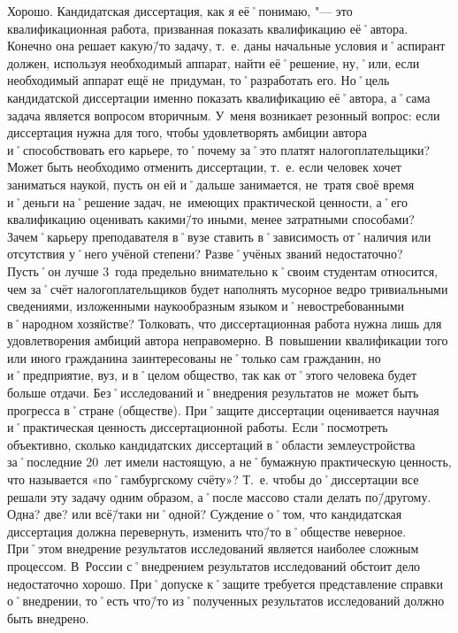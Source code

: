\begin{drama}
	\maxspeaks Хорошо. Кандидатская диссертация, как я её˚понимаю, "--- это квалификационная работа, призванная показать квалификацию её˚автора. Конечно она решает какую\=/то задачу, т.~е. даны начальные условия и˚аспирант должен, используя необходимый аппарат, найти её˚решение, ну,˚или, если необходимый аппарат ещё не~придуман, то˚разработать его. Но˚цель кандидатской диссертации именно показать квалификацию её˚автора, а˚сама задача является вопросом вторичным. У~меня возникает резонный вопрос: если диссертация нужна для того, чтобы удовлетворять амбиции автора и˚способствовать его карьере, то˚почему за˚это платят налогоплательщики? Может быть необходимо отменить диссертации, т.~е. если человек хочет заниматься наукой, пусть он ей и˚дальше занимается, не~тратя своё время и˚деньги на˚решение задач, не~имеющих практической ценности, а˚его квалификацию оценивать какими\=/то иными, менее затратными способами? Зачем˚карьеру преподавателя в˚вузе ставить в˚зависимость от˚наличия или отсутствия у˚него учёной степени? Разве˚учёных званий недостаточно? Пусть˚он лучше 3~года предельно внимательно к˚своим студентам относится, чем за˚счёт налогоплательщиков будет наполнять мусорное ведро тривиальными сведениями, изложенными наукообразным языком и˚невостребованными в˚народном хозяйстве?
	\michaelspeaks Толковать, что диссертационная работа нужна лишь для удовлетворения амбиций автора неправомерно. В~повышении квалификации того или иного гражданина заинтересованы не˚только сам гражданин, но и˚предприятие, вуз, и в˚целом общество, так как от˚этого человека будет больше отдачи. Без˚исследований и˚внедрения результатов не~может быть прогресса в˚стране (обществе). При˚защите диссертации оценивается научная и˚практическая ценность диссертационной работы.
	\maxspeaks Если˚посмотреть объективно, сколько кандидатских диссертаций в˚области землеустройства за˚последние 20~лет имели настоящую, а не˚бумажную практическую ценность, что называется  «по˚гамбургскому счёту»? Т.~е. чтобы до˚диссертации все решали эту задачу одним образом, а˚после массово стали делать по\=/другому. Одна? две? или всё\=/таки ни˚одной? 
	\michaelspeaks Суждение о˚том, что кандидатская диссертация должна перевернуть, изменить что\=/то в˚обществе неверное. При˚этом внедрение результатов исследований является наиболее сложным процессом. В~России с˚внедрением результатов исследований обстоит дело недостаточно хорошо. При˚допуске к˚защите требуется представление справки о˚внедрении, то˚есть что\=/то из˚полученных результатов исследований должно быть внедрено.
	

\end{drama}
